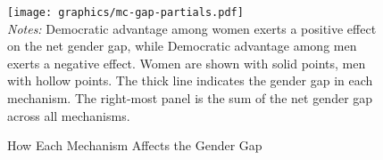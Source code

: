 \documentclass[12pt
               ,final
               ]{article}
\newcommand{\notes}[1]{\\
\small
\emph{Notes:} #1}
\begin{document}


\begin{figure}
  \centering
  \caption{How Each Mechanism Affects the Gender Gap}
  \label{fig:partials-on-gap}
  \texttt{[image: graphics/mc-gap-partials.pdf]}
  \notes{Democratic advantage among women exerts a positive effect on the net gender gap, while Democratic advantage among men exerts a negative effect. Women are shown with solid points, men with hollow points. The thick line indicates the gender gap in each mechanism. The right-most panel is the sum of the net gender gap across all mechanisms.}
\end{figure}
\end{document}
